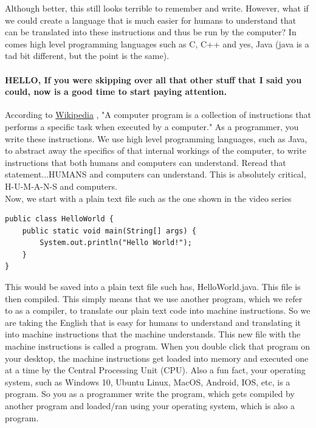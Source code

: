 \documentclass[11]{article}
\begin{document}
Although better, this still looks terrible to remember and write. However, what if we could create a language that is much easier for humans to understand that can be translated into these instructions and thus be run by the computer? In comes high level programming languages such as C, C++ and yes, Java (java is a tad bit different, but the point is the same).\\

\paragraph{HELLO, If you were skipping over all that other stuff that I said you could, now is a good time to start paying attention.} 
According to \href{https://en.wikipedia.org/wiki/Computer_program}{Wikipedia} , "A computer program is a collection of instructions that performs a specific task when executed by a computer." As a programmer, you write these instructions. We use high level programming languages, such as Java, to abstract away the specifics of that internal workings of the computer, to write instructions that both humans and computers can understand. Reread that statement...HUMANS and computers can understand. This is absolutely critical, H-U-M-A-N-S and computers.\\

Now, we start with a plain text file such as the one shown in the video series
\begin{lstlisting}
public class HelloWorld {
    public static void main(String[] args) {
        System.out.println("Hello World!");
    }
}
\end{lstlisting}

This would be saved into a plain text file such has, HelloWorld.java. This file is then compiled. This simply means that we use another program, which we refer to as a compiler, to translate our plain text code into machine instructions. So we are taking the English that is easy for humans to understand and translating it into machine instructions that the machine understands. This new file with the machine instructions is called a program. When you double click that program on your desktop, the machine instructions get loaded into memory and executed one at a time by the Central Processing Unit (CPU). Also a fun fact, your operating system, such as Windows 10, Ubuntu Linux, MacOS, Android, IOS, etc, is a program. So you as a programmer write the program, which gets compiled by another program and loaded/ran using your operating system, which is also a program.\\
\end{document}
